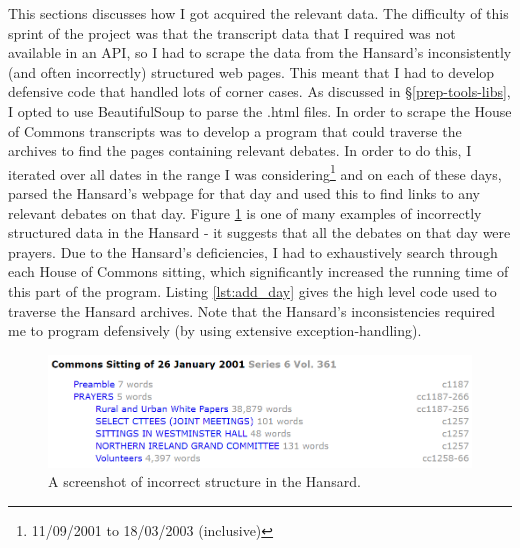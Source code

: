 \documentclass[12pt,a4paper,twoside,openright]{report}
\newcommand{\mylisting}[4]{}
\newcommand{\pylisting}[2]{\mylisting{Python}{py}{#1}{#2}}
\begin{document}
This sections discusses how I got acquired the relevant data. The difficulty of this sprint of the project was that the transcript data that I required was not available in an API, so I had to scrape the data from the Hansard's inconsistently (and often incorrectly) structured web pages. This meant that I had to develop defensive code that handled lots of corner cases. As discussed in \S\ref{prep-tools-libs}, I opted to use BeautifulSoup to parse the .html files.
\newline
In order to scrape the House of Commons transcripts was to develop a program that could traverse the archives to find the pages containing relevant debates. In order to do this, I iterated over all dates in the range I was considering\footnote{11/09/2001 to 18/03/2003 (inclusive)} and on each of these days, parsed the Hansard's webpage for that day and used this to find links to any relevant debates on that day. Figure \ref{fig:incorrecthansard} is one of many examples of incorrectly structured data in the Hansard - it suggests that all the debates on that day were prayers. Due to the Hansard's deficiencies, I had to exhaustively search through each House of Commons sitting, which significantly increased the running time of this part of the program. Listing \ref{lst:add_day} gives the high level code used to traverse the Hansard archives. Note that the Hansard's inconsistencies required me to program defensively (by using extensive exception-handling).
\newline

\begin{figure}
	\includegraphics[width=\linewidth]{figs/incorrecthansard.png}
	\caption{A screenshot of incorrect structure in the Hansard.}
	\label{fig:incorrecthansard}
\end{figure}

\pylisting{High-level code used to scrape all the debates from a given day.}{add_day}
\end{document}
